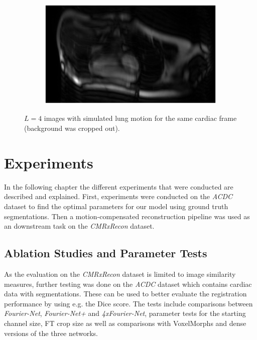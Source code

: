 \begin{figure}[h]
\begin{subfigure}{0.475\textwidth}
    		\label{fig:LungMotion3}
	\end{subfigure}
	\hfill
	\begin{subfigure}{0.475\textwidth}
    		\includegraphics[width=\textwidth]{./Images/LungMotion4.png}
    		\label{fig:LungMotion4}
	\end{subfigure}
	\caption{$L=4$ images with simulated lung motion for the same cardiac frame (background was cropped out).}
	\label{fig:LungMotion}
\end{figure}


\section{Experiments} \label{Sec:Experiments}
In the following chapter the different experiments that were conducted are described and explained. 
First, experiments were conducted on the \emph{ACDC} dataset to find the optimal parameters for our model using ground truth segmentations. Then a motion-compensated reconstruction pipeline was used as an downstream task on the \emph{CMRxRecon} dataset.


\subsection{Ablation Studies and Parameter Tests} \label{SubSec:ParameterTestsACDC}
As the evaluation on the \emph{CMRxRecon} dataset is limited to image similarity measures, further testing was done on the \emph{ACDC} dataset which contains cardiac data with segmentations. These can be used to better evaluate the registration performance by using e.g. the Dice score. The tests include comparisons between \emph{Fourier-Net}, \emph{Fourier-Net+} and \emph{4xFourier-Net}, parameter tests for the starting channel size, FT crop size as well as comparisons with VoxelMorphs and dense versions of the three networks.


